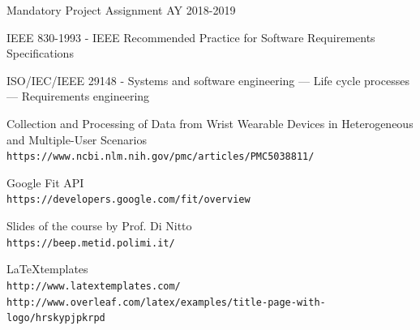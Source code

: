 \documentclass[12pt]{article}
\begin{document}
\clearpage
\begin{thebibliography}{9}
   Mandatory Project Assignment AY 2018-2019

   IEEE 830-1993 - IEEE Recommended Practice for Software Requirements Specifications

   ISO/IEC/IEEE 29148 - Systems and software engineering — Life cycle processes — Requirements engineering

   Collection and Processing of Data from Wrist Wearable Devices in Heterogeneous and Multiple-User Scenarios \\
  \texttt{https://www.ncbi.nlm.nih.gov/pmc/articles/PMC5038811/}

   Google Fit API\\
  \texttt{https://developers.google.com/fit/overview}

  Slides of the course by Prof. Di Nitto
  \\\texttt{https://beep.metid.polimi.it/}

  \LaTeX templates
  \\\texttt{http://www.latextemplates.com/}
  \\\texttt
  {http://www.overleaf.com/latex/examples/title-page-with-logo/hrskypjpkrpd}


\end{thebibliography}
\end{document}
